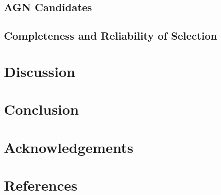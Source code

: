 \documentclass[12pt]{iopart}
\begin{document}
\subsection{AGN Candidates}
\subsection{Completeness and Reliability of Selection}
\section{Discussion}
\section{Conclusion}
\section{Acknowledgements}
\newpage
\section{References}



\end{document}
